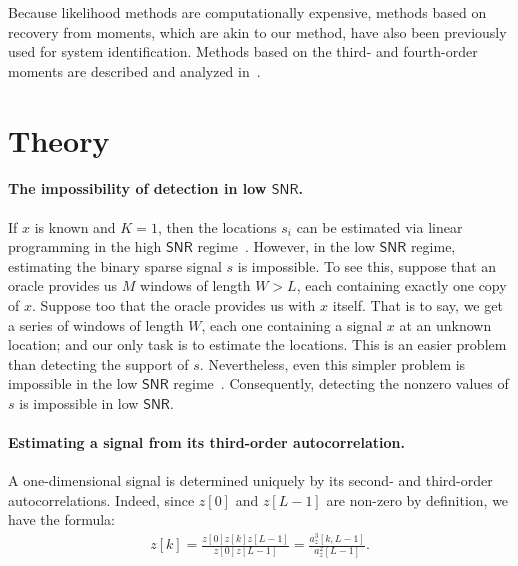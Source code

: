 \documentclass[english,11pt]{article}
\newcommand{\1}{\mathbf{1}}
\numberwithin{equation}{section}
\theoremstyle{plain}
\theoremstyle{definition}
\theoremstyle{remark}
\theoremstyle{plain}
\theoremstyle{remark}
\theoremstyle{plain}
\theoremstyle{plain}
\newcommand{\SNR}{\ensuremath{\textsf{SNR}}}
\begin{document}
Because likelihood methods are computationally expensive, methods based on recovery from moments, which are akin to our method, have also been previously used for system identification. Methods based on the third- and fourth-order moments are described and analyzed in~\cite{lii1982deconvolution,giannakis1989identification,tugnait1984identification}.

%




\section{Theory} \label{sec:theory}

\paragraph{The impossibility of detection in low $\SNR$.}
If $x$ is known and $K=1$, then the locations $s_i$ can be estimated via linear programming  in the high $\SNR$ regime~\cite{azais2015spike,denoyelle2017support,bendory2016robust,bendory2017robust,bernstein2017deconvolution}. However, in the low $\SNR$ regime, estimating the binary sparse signal $s$ is impossible. To see this, suppose that an oracle provides us $M$ windows of length $W>L$, each containing exactly one copy of $x$. Suppose too that the oracle provides us with $x$ itself. That is to say, we get a series of windows of length $W$, each one containing a signal $x$ at an unknown location; and our only task is to estimate the locations. This is an easier problem than detecting the support of $s$. Nevertheless, even this simpler problem is impossible in the low $\SNR$ regime~\cite{aguerrebere2016fundamental}. Consequently, detecting the nonzero values of $s$ is impossible in low $\SNR$. 


%

\paragraph{Estimating a signal from its third-order autocorrelation.}

A one-dimensional signal is determined uniquely by its second- and third-order autocorrelations. Indeed, since $z[0]$ and $z[L-1]$ are non-zero by definition, we have the formula:
%
\begin{align} \label{eq-uniqueness}
%
z[k] = \frac{z[0]z[k]z[L-1]}{z[0]z[L-1]} = \frac{a_z^3[k,L-1]}{a_z^2[L-1]}.
%
\end{align}
\end{document}
